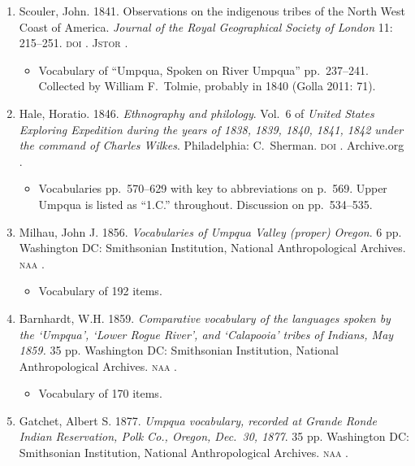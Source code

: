 \documentclass[12pt,letterpaper,oneside,article]{memoir}
\begin{document}
\begin{enumerate}
\item	Scouler, John.
	1841.
	Observations on the indigenous tribes of the North West Coast of America.
	\textit{Journal of the Royal Geographical Society of London} 11: 215–251.
	\textsc{doi} .
	\textsc{Jstor} .
	\begin{itemize}
	\item	Vocabulary of “Umpqua, Spoken on River Umpqua” pp.\ 237–241.
		Collected by William F.\ Tolmie, probably in 1840 (Golla 2011: 71).
	\end{itemize}
\item	Hale, Horatio.
	1846.
	\textit{Ethnography and philology}.
	Vol.\ 6 of \textit{United States Exploring Expedition during the years of 1838, 1839,
		1840, 1841, 1842 under the command of Charles Wilkes}.
	Philadelphia: C.\ Sherman.
	\textsc{doi} .
	Archive.org .
	\begin{itemize}
	\item	Vocabularies pp.\ 570–629 with key to abbreviations on p.\ 569.
		Upper Umpqua is listed as “1.C.” throughout.
		Discussion on pp.\ 534–535.
	\end{itemize}
\item	Milhau, John J.
	1856.
	\textit{Vocabularies of Umpqua Valley (proper) Oregon}.
	6 pp.
	Washington DC: Smithsonian Institution, National Anthropological Archives.
	\textsc{naa} .
	\begin{itemize}
	\item	Vocabulary of 192 items.
	\end{itemize}
\item	Barnhardt, W.H.
	1859.
	\textit{Comparative vocabulary of the languages spoken by the ‘Umpqua’,
		‘Lower Rogue River’, and ‘Calapooia’ tribes of Indians, May 1859.}
	35 pp.
	Washington DC: Smithsonian Institution, National Anthropological Archives.
	\textsc{naa} .
	\begin{itemize}
	\item	Vocabulary of 170 items.
	\end{itemize}
\item	Gatchet, Albert S.
	1877.
	\textit{Umpqua vocabulary, recorded at Grande Ronde Indian Reservation, Polk Co.,
		Oregon, Dec.\ 30, 1877}.
	35 pp.
	Washington DC: Smithsonian Institution, National Anthropological Archives.		
	\textsc{naa} .
	\begin{itemize}

\end{itemize}
\end{enumerate}
\end{document}
